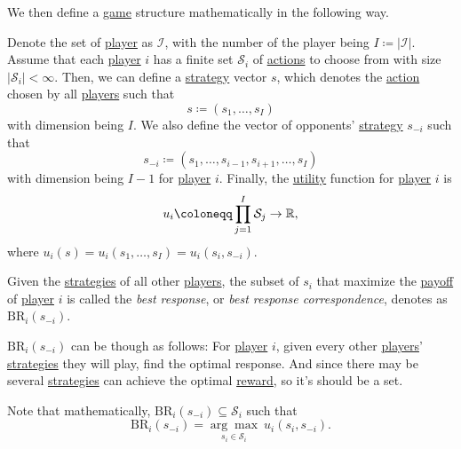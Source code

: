 We then define a \hyperref[def:game]{game} structure mathematically in the following way.
\begin{definition}\label{def:mathematical-game}
	Denote the set of \hyperref[def:player]{player} as \(\mathcal{I}\), with the number of the player being \(I\coloneqq \left\vert \mathcal{I} \right\vert \). Assume that each \hyperref[def:player]{player} \(i\) has a finite set \(\mathcal{S}_i\) of \hyperref[def:strategy]{actions} to choose from with size \(\left\vert \mathcal{S}_i \right\vert<\infty  \). Then, we can define a \hyperref[def:strategy]{strategy} vector \(s\), which denotes the \hyperref[def:strategy]{action} chosen by all \hyperref[def:player]{players} such that
	\[
		s\coloneqq (s_1, \ldots , s_I)
	\]
	with dimension being \(I\). We also define the vector of opponents' \hyperref[def:strategy]{strategy} \(s_{-i}\) such that
	\[
		s_{-i}\coloneqq (s_1,\ldots,s_{i - 1},s_{i + 1} ,\ldots,s_I)
	\]
	with dimension being \(I - 1\) for \hyperref[def:player]{player} \(i\). Finally, the \hyperref[def:reward]{utility} function for \hyperref[def:player]{player} \(i\) is
	\[
		u_{i} \coloneqq \prod\limits_{j = 1}^{I} \mathcal{S}_j \to \mathbb{\MakeUppercase{R}},
	\]
	where \(u_{i}(s) = u_{i}(s_1, \ldots , s_I) = u_{i}(s_{i}, s_{-i})\).
\end{definition}

\begin{definition}\label{def:best-response}
	Given the \hyperref[def:strategy]{strategies} of all other \hyperref[def:player]{players}, the subset of \(s_{i}\) that maximize the \hyperref[def:reward]{payoff} of \hyperref[def:player]{player} \(i\) is called the \emph{best response}, or \emph{best response correspondence}, denotes as \(\mathrm{BR}_i(s_{-i})\).
\end{definition}

\begin{intuition}
	\(\mathrm{BR}_i(s_{-i})\) can be though as follows: For \hyperref[def:player]{player} \(i\), given every other \hyperref[def:player]{players}' \hyperref[def:strategy]{strategies} they will play, find the optimal response. And since there may be several \hyperref[def:strategy]{strategies} can achieve the optimal \hyperref[def:reward]{reward}, so it's should be a set.
\end{intuition}

\begin{remark}
	Note that mathematically, \(\mathrm{BR}_i(s_{-i}) \subseteq \mathcal{S}_i\) such that
	\[
		\mathrm{BR}_i(s_{-i})= \underset{s_{i}\in\mathcal{S}_i}{\arg\max}\ u_{i}(s_{i}, s_{-i}).
	\]
\end{remark}